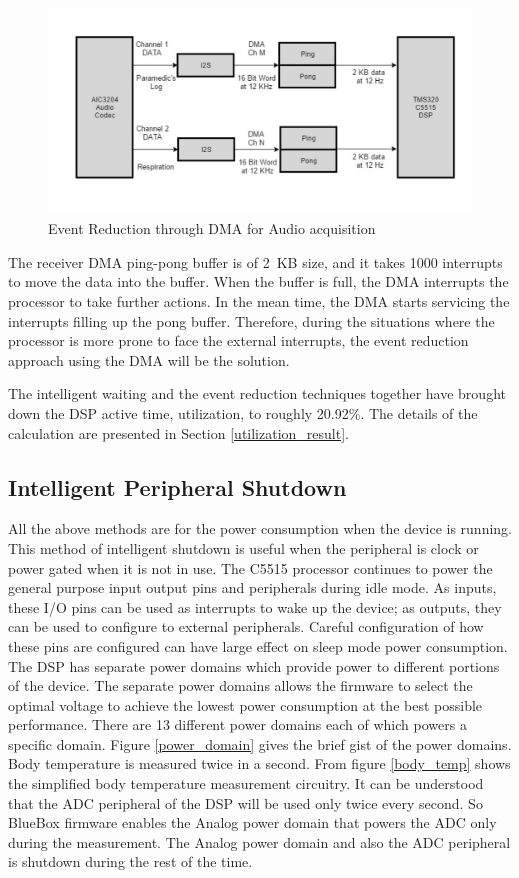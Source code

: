  \begin{figure}
	\centering
	\includegraphics[scale = 0.5 ]{Event_Reduction}
\caption{Event Reduction through DMA for Audio acquisition}
\label{event_reduction}
\end{figure}


The receiver DMA ping-pong buffer is of 2~KB size, and it takes 1000
interrupts to move the data into the buffer. When the buffer is full,
the DMA interrupts the processor to take further actions. In the mean
time, the DMA starts servicing the interrupts filling up the pong
buffer. Therefore, during the situations where the processor is more
prone to face the external interrupts, the event reduction approach
using the DMA will be the solution.
 
The intelligent waiting and the event reduction techniques together
have brought down the DSP active time, utilization, to roughly
20.92\%. The details of the calculation are presented in Section
\ref{utilization_result}.

\subsection{Intelligent Peripheral Shutdown}

All the above methods are for the power consumption when the device
is running. This method of intelligent shutdown is useful when the
peripheral is clock or power gated when it is not in use. The C5515
processor continues to power the general purpose input output pins
and peripherals during idle mode. As inputs, these I/O pins can be
used as interrupts to wake up the device; as outputs, they can be
used to configure to external peripherals. Careful configuration of
how these pins are configured can have large effect on sleep mode
power consumption. The DSP has separate power domains which provide
power to different portions of the device. The separate power domains
allows the firmware to select the optimal voltage to achieve the
lowest power consumption at the best possible performance. There are
13 different power domains each of which powers a specific domain.
Figure \ref{power_domain} gives the brief gist of the power domains.
Body temperature is measured twice in a second. From figure
\ref{body_temp} shows the simplified body temperature measurement
circuitry. It can be understood that the ADC peripheral of the DSP
will be used only twice every second. So BlueBox firmware enables the
Analog power domain that powers the ADC only during the measurement.
The Analog power domain and also the ADC peripheral is shutdown
during the rest of the time. 

